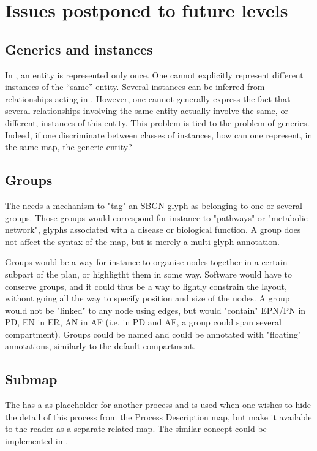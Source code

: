 \chapter{Issues postponed to future levels}\label{sec:postponed}

\section{Generics and instances}\label{sec:instances}

In \SBGNERLone, an entity is represented only once. One cannot explicitly represent different instances of the ``same'' entity. Several instances can be inferred from relationships acting in . However, one cannot generally express the fact that several relationships involving the same entity actually involve the same, or different, instances of this entity. This problem is tied to the problem of generics. Indeed, if one discriminate between classes of instances, how can one represent, in the same map, the generic entity?


\section{Groups}\label{sec:groups}

The \SBGNERLone needs a mechanism to "tag" an SBGN glyph as belonging to one or several groups. Those groups would correspond for instance to "pathways" or "metabolic network", glyphs associated with a disease or biological function. A group does not affect the syntax of the map, but is merely a multi-glyph annotation.

Groups would be a way for instance to organise nodes together in a certain subpart of the plan, or highligtht them in some way. Software would have to conserve groups, and it could thus be a way to lightly constrain the layout, without going all the way to specify position and size of the nodes. A group would not be "linked" to any node using edges, but would "contain" EPN/PN in PD, EN in ER, AN in AF (i.e. in PD and AF, a group could span several compartment). Groups could be named and could be annotated with "floating" annotations, similarly to the default compartment.

\section{Submap}\label{sec:submap}

The \SBGNPDLone has a  as placeholder for another process and is used when one wishes to hide the detail of this process from the Process Description map, but make it available to the reader as a separate related map. The similar concept could be implemented in \SBGNERLone.

